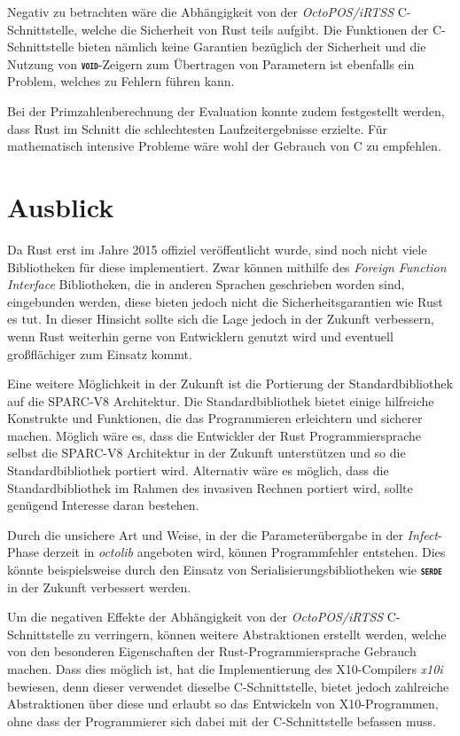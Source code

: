 Negativ zu betrachten wäre die Abhängigkeit von der \textit{OctoPOS/iRTSS} C-Schnittstelle,
welche die Sicherheit von Rust teils aufgibt. Die Funktionen der C-Schnittstelle bieten nämlich keine Garantien 
bezüglich der Sicherheit und die Nutzung von \texttt{\textsc{\textbf{void}}}-Zeigern zum Übertragen
von Parametern ist ebenfalls ein Problem, welches zu Fehlern führen kann.

Bei der Primzahlenberechnung der Evaluation konnte zudem festgestellt werden, dass Rust im Schnitt die schlechtesten
Laufzeitergebnisse erzielte. Für mathematisch intensive Probleme wäre wohl der Gebrauch von C zu empfehlen.

\section{Ausblick}

Da Rust erst im Jahre 2015 offiziel veröffentlicht wurde, sind noch nicht viele Bibliotheken für diese implementiert.
Zwar können mithilfe des \textit{Foreign Function Interface} Bibliotheken,
die in anderen Sprachen geschrieben worden sind, eingebunden werden, diese bieten jedoch
nicht die Sicherheitsgarantien wie Rust es tut.
In dieser Hinsicht sollte sich die Lage jedoch in der Zukunft verbessern, wenn Rust
weiterhin gerne von Entwicklern genutzt wird und eventuell großflächiger zum Einsatz kommt.

Eine weitere Möglichkeit in der Zukunft ist die Portierung der Standardbibliothek auf die SPARC-V8 Architektur.
Die Standardbibliothek bietet einige hilfreiche Konstrukte und Funktionen,
die das Programmieren erleichtern und sicherer machen.
Möglich wäre es, dass die Entwickler der Rust Programmiersprache selbst die SPARC-V8 Architektur
in der Zukunft unterstützen und so die Standardbibliothek portiert wird. Alternativ wäre es möglich, dass die 
Standardbibliothek im Rahmen des invasiven Rechnen portiert wird, sollte genügend Interesse daran bestehen.

Durch die unsichere Art und Weise, in der die Parameterübergabe in der \textit{Infect}-Phase derzeit in
\textit{octolib} angeboten wird, können Programmfehler entstehen. Dies könnte beispielsweise durch den Einsatz von
Serialisierungsbibliotheken wie \texttt{\textsc{\textbf{serde}}} in der Zukunft verbessert werden.

Um die negativen Effekte der Abhängigkeit von der \textit{OctoPOS/iRTSS} C-Schnittstelle zu verringern,
können weitere Abstraktionen erstellt werden, welche von den
besonderen Eigenschaften der Rust-Programmiersprache Gebrauch machen.
Dass dies möglich ist, hat die Implementierung des X10-Compilers \textit{x10i} bewiesen,
denn dieser verwendet dieselbe C-Schnittstelle,
bietet jedoch zahlreiche Abstraktionen über diese und erlaubt so
das Entwickeln von X10-Programmen, ohne dass der Programmierer sich dabei mit der C-Schnittstelle befassen muss.
